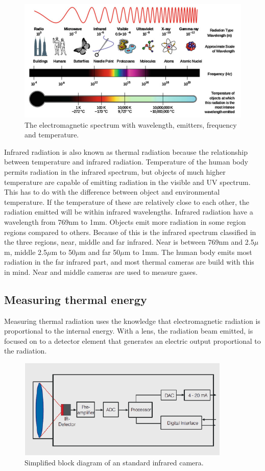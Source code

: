 \begin{figure}[H]                                         
	\includegraphics[width=.66\textwidth]{figures/em_spectrum}  
	\caption{The electromagnetic spectrum with wavelength, emitters, frequency and temperature.\cite{ignacio2017}}
	\label{fig:em_spectrum}  
\end{figure}   

Infrared radiation is also known as thermal radiation because the relationship between temperature and infrared radiation. Temperature of the human body permits radiation in the infrared spectrum, but objects of much higher temperature are capable of emitting radiation in the visible and UV spectrum. This has to do with the difference between object and environmental temperature. If the temperature of these are relatively close to each other, the radiation emitted will be within infrared wavelengths. Infrared radiation have a wavelength from 769nm to 1mm. Objects emit more radiation in some region regions compared to others. Because of this is the infrared spectrum classified in the three regions, near, middle and far infrared. Near is between 769nm and 2.5$\mu$m, middle 2.5$\mu$m to 50$\mu$m and far 50$\mu$m to 1mm. The human body emits most radiation in the far infrared part, and most thermal cameras are build with this in mind. Near and middle cameras are used to measure gases.\cite{ignacio2017} 



\subsection{Measuring thermal energy}

Measuring thermal radiation uses the knowledge that electromagnetic radiation is proportional to the internal energy. With a lens, the radiation beam emitted, is focused on to a detector element that generates an electric output proportional to the radiation.\cite{optris2009}

\begin{figure}[H]                                         
	\includegraphics[width=.55\textwidth]{figures/IR_cam}  
	\caption{Simplified block diagram of an standard infrared camera.\cite{optris2009}}
	\label{fig:em_spectrum}  
\end{figure} 

